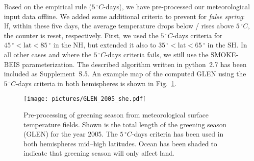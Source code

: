 \documentclass[gmd, manuscript]{copernicus}
\begin{document}
Based on the empirical rule ($5\,\unit{^\circ C}$-days), we have pre-processed our meteorological input data offline. We added some additional criteria to prevent for \emph{false spring}: If, within these five days, the average temperature drops below / rises above $5\,\unit{^\circ C}$, the counter is reset, respectively. First, we used the $5\,\unit{^\circ C}$-days criteria for $45\,\unit{^\circ} < \text{lat} < 85\,\unit{^\circ}$ in the NH, but extended it also to $35\,\unit{^\circ} < \text{lat} < 65\,\unit{^\circ}$ in the SH. In all other cases and where the $5\,\unit{^\circ C}$-days criteria fails, we still use the SMOKE-BEIS parameterization. The described algorithm written in python~2.7 has been included as Supplement~S.5. An example map of the computed GLEN using the $5\,\unit{^\circ C}$-days criteria in both hemispheres is shown in Fig.~\ref{fig:glen_2015_she}.
%
\begin{figure}[t]
  \texttt{[image: pictures/GLEN\_2005\_she.pdf]}
  \caption{Pre-processing of greening season from meteorological surface temperature fields. Shown is the total length of the greening season (GLEN) for the year 2005. The $5\,\unit{^\circ C}$-days criteria has been used in both hemispheres mid--high latitudes. Ocean has been shaded to indicate that greening season will only affect land.}
  \label{fig:glen_2015_she}
\end{figure}
%
\end{document}
